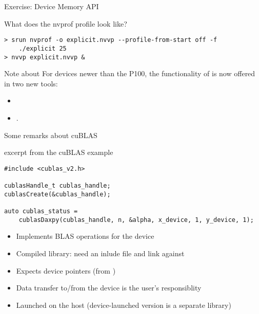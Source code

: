 \documentclass[aspectratio=43]{beamer}
\begin{document}
\begin{frame}[fragile]{Exercise: Device Memory API}

What does the nvprof profile look like?

\begin{terminal}{}
\begin{lstlisting}[style=terminal]
> srun nvprof -o explicit.nvvp --profile-from-start off -f
    ./explicit 25
> nvvp explicit.nvvp &
\end{lstlisting}
\end{terminal}

\begin{info}{Note about }
For devices newer than the P100, the functionality of 
is now offered in two new tools:
  \begin{itemize}
    \item {}
    \item {}.
  \end{itemize}
\end{info}

\end{frame}


\begin{frame}[fragile]{Some remarks about cuBLAS}

    \begin{code}{excerpt from the cuBLAS example}
        \begin{lstlisting}[style=boxcudatiny]
#include <cublas_v2.h>

cublasHandle_t cublas_handle;
cublasCreate(&cublas_handle);

auto cublas_status =
    cublasDaxpy(cublas_handle, n, &alpha, x_device, 1, y_device, 1);

        \end{lstlisting}
    \end{code}

    \begin{itemize}
        \item Implements BLAS operations for the device
        \item Compiled library: need an inlude file and link against 
        \item Expects device pointers (from )
        \item Data transfer to/from the device is the user's responsiblity
        \item Launched on the host (device-launched version is a separate library)
    \end{itemize}

\end{frame}
\end{document}
